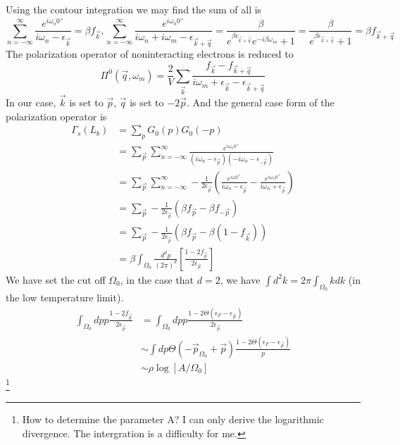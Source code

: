 \documentclass[12pt]{article}
\numberwithin{equation}{section}
\begin{document}
		Using the contour integration we may find the sum of all is
		\begin{equation}
			\sum_{n=-\infty}^{\infty} \frac{e^{i \omega_{n} 0^{+}}}{i \omega_{n}-\epsilon_{\vec{k}} }=\beta f_{\vec{k}}, \sum_{n=-\infty}^{\infty} \frac{e^{i \omega_{n} 0^{+}}}{i \omega_{n}+i \omega_{m}-\epsilon_{\vec{k}+\vec{q}} }=\frac{\beta }{e^{\beta \epsilon_{\vec{k}+\vec{q}}} e^{-i \beta \omega_{m}}+1}=\frac{\beta}{e^{\beta\epsilon_{\vec{k}+\vec{q}}}+1}=\beta f_{\vec{k}+\vec{q}}
		\end{equation} 
The polarization operator of noninteracting electrons is reduced to
\begin{equation}
	\Pi^{0}\left(\vec{q}, \omega_{m}\right)=\frac{2}{V} \sum_{\vec{k}} \frac{f_{\vec{k}}-f_{\vec{k}+\vec{q}}}{i \omega_{m}+\epsilon_{\vec{k}}-\epsilon_{\vec{k}+\vec{q}}}
	\end{equation}
In our case, $\vec{k}$ is set to $\vec{p}$, $\vec{q}$ is set to $-2\vec{p}$. And the general case form of the polarization operator is 
\begin{equation}
	\begin{aligned}
	\Gamma_{s}\left(L_{b}\right) & =\sum_{p} G_{0}(p) G_{0}(-p)\\
		& = \sum_{\vec{p}}\sum_{n=-\infty}^{\infty}\frac{e^{i \omega_{n} 0^{+}}}{\left(i \omega_{n}-\epsilon_{\vec{p}} \right)\left(-i \omega_{n}-\epsilon_{-\vec{p}}\right)}\\
		& =\sum_{\vec{p}}\sum_{n=-\infty}^{\infty}-\frac{1}{2\epsilon_{\vec{p}}}\left(\frac{e^{i\omega 0^+}}{i\omega_n-\epsilon_{\vec{p}}}-\frac{e^{i\omega_n 0^+}}{i\omega_n+\epsilon_{\vec{p}}}\right)\\
		& =\sum_{\vec{p}}-\frac{1}{2\epsilon_{\vec{p}}}(\beta f_{\vec{p}}-\beta f_{-\vec{p}})\\
		& =\sum_{\vec{p}}-\frac{1}{2\epsilon_{\vec{p}}}(\beta f_{\vec{p}}-\beta (1-f_{\vec{k}}))\\
		& = \beta\int_{\Omega_{0}} \frac{d^{d} p}{(2 \pi)^{d}}\left[\frac{1-2 f_{\vec{p}}}{2 \epsilon_{\vec{p}}}\right]
	\end{aligned}
	\end{equation}
We have set the cut off $\Omega_0$, in the case that $d=2$, we have $\int d^2k=2\pi\int_{\Omega_0}kdk$ (in the low temperature limit).
\begin{equation}
	\begin{aligned}
\int_{\Omega_0}dpp\frac{1-2 f_{\vec{p}}}{2 \epsilon_{\vec{p}}}  & = \int_{\Omega_0}dpp\frac{1-2\Theta(\epsilon_{F}-\epsilon_{\vec{p}})}{2\epsilon_{\vec{p}}}\\
& \sim \int dp \Theta(-\vec{p}_{\Omega_0}+\vec{p})\frac{1-2\Theta(\epsilon_{F}-\epsilon_{\vec{p}})}{p}\\
& \sim \rho\log[A/\Omega_0]
	\end{aligned}
\end{equation}\footnote{How to determine the parameter A? I can only derive the logarithmic divergence. The intergration is a difficulty for me.}
\end{document}
